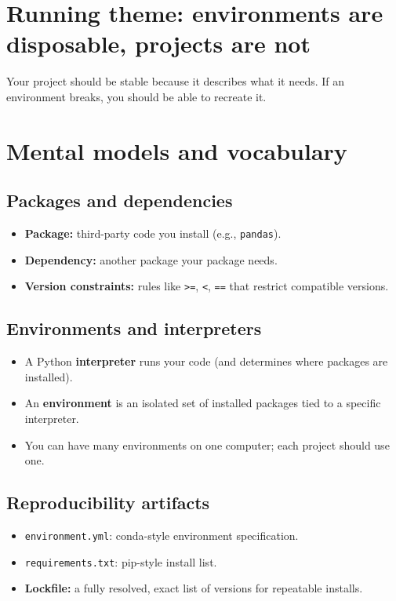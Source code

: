 \section*{Running theme: environments are disposable, projects are not}
Your project should be stable because it describes what it needs. If an environment breaks, you should be able to recreate it.

\section{Mental models and vocabulary}
\subsection{Packages and dependencies}
\begin{itemize}
\item \textbf{Package:} third-party code you install (e.g., \texttt{pandas}).
\item \textbf{Dependency:} another package your package needs.
\item \textbf{Version constraints:} rules like \texttt{>=}, \texttt{<}, \texttt{==} that restrict compatible versions.
\end{itemize}

\subsection{Environments and interpreters}
\begin{itemize}
\item A Python \textbf{interpreter} runs your code (and determines where packages are installed).
\item An \textbf{environment} is an isolated set of installed packages tied to a specific interpreter.
\item You can have many environments on one computer; each project should use one.
\end{itemize}

\subsection{Reproducibility artifacts}
\begin{itemize}
\item \texttt{environment.yml}: conda-style environment specification.
\item \texttt{requirements.txt}: pip-style install list.
\item \textbf{Lockfile:} a fully resolved, exact list of versions for repeatable installs.
\end{itemize}

